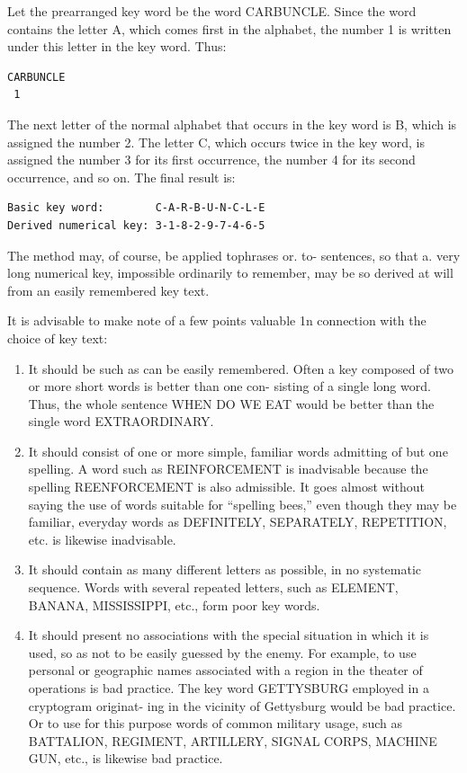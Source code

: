 \mypara Let the prearranged key word be the word CARBUNCLE. Since
the word contains the letter A, which comes first in the alphabet, the
number 1 is written under this letter in the key word. Thus:

\begin{verbatim}
CARBUNCLE
 1
\end{verbatim}


The next letter of the normal alphabet that occurs in the key word is B,
which is assigned the number 2. The letter C, which occurs twice in the
key word, is assigned the number 3 for its first occurrence, the number 4
for its second occurrence, and so on. The final result is:

\begin{verbatim}
Basic key word:        C-A-R-B-U-N-C-L-E
Derived numerical key: 3-1-8-2-9-7-4-6-5
\end{verbatim}

\mypara The method may, of course, be applied tophrases or. to- sentences,
so that a. very long numerical key, impossible ordinarily to remember,
may be so derived at will from an easily remembered key text.

\mypara It is advisable to make note of a few points valuable 1n connection
with the choice of key text:

\begin{enumerate}
\item It should be such as can be easily remembered. Often a key
composed of two or more short words is better than one con-
sisting of a single long word. Thus, the whole sentence WHEN
DO WE EAT would be better than the single word
EXTRAORDINARY.

\item It should consist of one or more simple, familiar words admitting of but one spelling. A word such as REINFORCEMENT
is inadvisable because the spelling REENFORCEMENT is
also admissible. It goes almost without saying the use of words
suitable for “spelling bees,” even though they may be familiar,
everyday words as DEFINITELY, SEPARATELY, REPETITION, etc. is likewise inadvisable.

\item It should contain as many different letters as possible, in no
systematic sequence. Words with several repeated letters, such
as ELEMENT, BANANA, MISSISSIPPI, etc., form poor
key words.

\item It should present no associations with the special situation in
which it is used, so as not to be easily guessed by the enemy.
For example, to use personal or geographic names associated
with a region in the theater of operations is bad practice. The
key word GETTYSBURG employed in a cryptogram originat-
ing in the vicinity of Gettysburg would be bad practice. Or to
use for this purpose words of common military usage, such as
BATTALION, REGIMENT, ARTILLERY, SIGNAL
CORPS, MACHINE GUN, etc., is likewise bad practice.
\end{enumerate}

